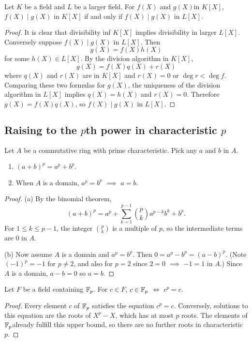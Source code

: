 \begin{theorem}
  Let $K$ be a field and $L$ be a larger field. For $f(X)$ and $g(X)$in
  $K[X]$, $f(X)\mid g(X)$ in $K[X]$ if and only if $f(X)\mid g(X)$ in
  $L[X]$.
\end{theorem}
\begin{proof}
  It is clear that divisibility inf $K[X]$ implies divisibility in larger
  $L[X]$. Conversely suppose $f(X)\mid g(X)$ in $L[X]$. Then
  \[
    g(X)=f(X)h(X)
  \]
  for some $h(X)\in L[X]$. By the division algorithm in $K[X]$,
  \[
    g(X)=f(X)q(X)+r(X)
  \]
  where $q(X)$ and $r(X)$ are in $K[X]$ and $r(X)=0$ or $\deg r<\deg
  f$. Comparing these two formulas for $g(X)$, the uniqueness of the
  division algorithm in $L[X]$ implies $q(X)=h(X)$ and $r(X)=0$. Therefore
  $g(X)=f(X)q(X)$, so $f(X)\mid g(X)$ in $L[X]$.
\end{proof}

\subsection[Raising to the pth power in characteristic p]{Raising to the $p$th power in characteristic $p$}
\begin{lemma}
  Let $A$ be a commutative ring with prime characteristic. Pick any $a$ and
  $b$ in $A$.
  \begin{enumerate}[label=\textnormal{(\alph*)}]
  \item $(a+b)^p=a^p+b^p$.
  \item When $A$ is a domain, $a^p=b^p$ $\implies$ $a=b$.
  \end{enumerate}
\end{lemma}
\begin{proof}
  (a) By the binomial theorem,
  \[
    (a+b)^p=a^p+\sum_{k=1}^{p-1}\binom{p}{k}a^{p-k}b^k+b^p.
  \]
  For $1\leq k\leq p-1$, the integer $\binom{p}{k}$ is a multiple of $p$,
  so the intermediate terms are $0$ in $A$.

  (b) Now assume $A$ is a domain and $a^p=b^p$. Then
  $0=a^p-b^p=(a-b)^p$. (Note $(-1)^p=-1$ for $p\neq 2$, and also for $p=2$
  since $2=0$ $\implies$ $-1=1$ in $A$.) Since $A$ is a domain, $a-b=0$ so
  $a=b$.
\end{proof}

\begin{lemma}
  Let $F$ be a field containing $\mathbb{F}_p$. For $c\in F$, $c\in\mathbb{F}_p$ $\iff$
  $c^p=c$.
\end{lemma}
\begin{proof}
  Every element $c$ of $\mathbb{F}_p$ satisfies the equation $c^p=c$. Conversely,
  solutions to this equation are the roots of $X^p-X$, which has at most
  $p$ roots. The elements of $\mathbb{F}_p$already fulfill this upper bound, so
  there are no further roots in characteristic $p$.
\end{proof}

